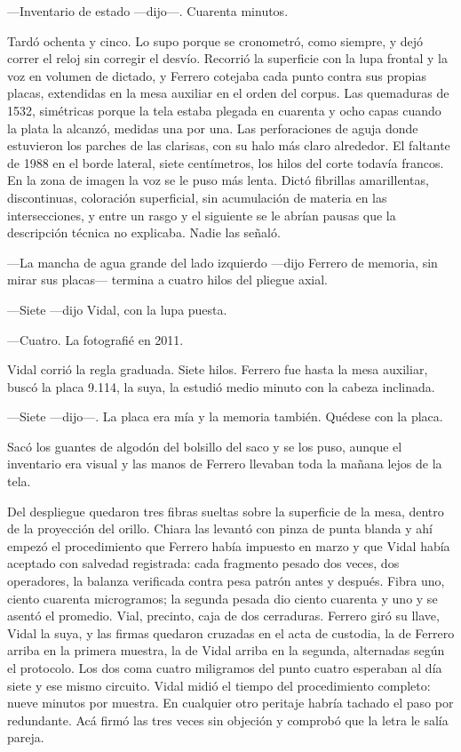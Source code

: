 ---Inventario de estado ---dijo---. Cuarenta minutos.

Tardó ochenta y cinco. Lo supo porque se cronometró, como siempre, y dejó correr el reloj sin corregir el desvío. Recorrió la superficie con la lupa frontal y la voz en volumen de dictado, y Ferrero cotejaba cada punto contra sus propias placas, extendidas en la mesa auxiliar en el orden del corpus. Las quemaduras de 1532, simétricas porque la tela estaba plegada en cuarenta y ocho capas cuando la plata la alcanzó, medidas una por una. Las perforaciones de aguja donde estuvieron los parches de las clarisas, con su halo más claro alrededor. El faltante de 1988 en el borde lateral, siete centímetros, los hilos del corte todavía francos. En la zona de imagen la voz se le puso más lenta. Dictó fibrillas amarillentas, discontinuas, coloración superficial, sin acumulación de materia en las intersecciones, y entre un rasgo y el siguiente se le abrían pausas que la descripción técnica no explicaba. Nadie las señaló.

---La mancha de agua grande del lado izquierdo ---dijo Ferrero de memoria, sin mirar sus placas--- termina a cuatro hilos del pliegue axial.

---Siete ---dijo Vidal, con la lupa puesta.

---Cuatro. La fotografié en 2011.

Vidal corrió la regla graduada. Siete hilos. Ferrero fue hasta la mesa auxiliar, buscó la placa 9.114, la suya, la estudió medio minuto con la cabeza inclinada.

---Siete ---dijo---. La placa era mía y la memoria también. Quédese con la placa.

Sacó los guantes de algodón del bolsillo del saco y se los puso, aunque el inventario era visual y las manos de Ferrero llevaban toda la mañana lejos de la tela.

Del despliegue quedaron tres fibras sueltas sobre la superficie de la mesa, dentro de la proyección del orillo. Chiara las levantó con pinza de punta blanda y ahí empezó el procedimiento que Ferrero había impuesto en marzo y que Vidal había aceptado con salvedad registrada: cada fragmento pesado dos veces, dos operadores, la balanza verificada contra pesa patrón antes y después. Fibra uno, ciento cuarenta microgramos; la segunda pesada dio ciento cuarenta y uno y se asentó el promedio. Vial, precinto, caja de dos cerraduras. Ferrero giró su llave, Vidal la suya, y las firmas quedaron cruzadas en el acta de custodia, la de Ferrero arriba en la primera muestra, la de Vidal arriba en la segunda, alternadas según el protocolo. Los dos coma cuatro miligramos del punto cuatro esperaban al día siete y ese mismo circuito. Vidal midió el tiempo del procedimiento completo: nueve minutos por muestra. En cualquier otro peritaje habría tachado el paso por redundante. Acá firmó las tres veces sin objeción y comprobó que la letra le salía pareja.

